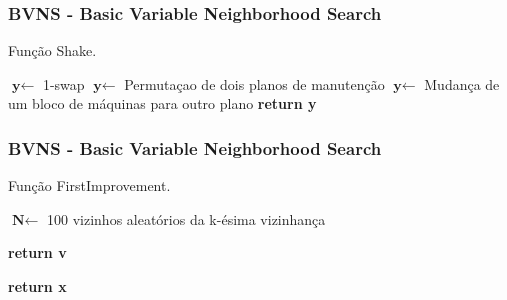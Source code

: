 \documentclass{beamer}
\begin{document}
    \begin{frame}
        \frametitle{BVNS - Basic Variable Neighborhood Search}
        \begin{algorithm}[H]
            \caption{Função Shake.}\label{alg:shake}
            \begin{algorithmic}[1]
                    \State $\textbf{y} \gets$ 1-swap
                \EndIf
                    \State $\textbf{y} \gets$ Permutaçao de dois planos de manutenção
                \EndIf
                    \State $\textbf{y} \gets$ Mudança de um bloco de máquinas para outro plano
                \EndIf
            \Statex
            \State \textbf{return y} 

            \EndProcedure 
            \end{algorithmic}
        \end{algorithm}
    \end{frame}

    \begin{frame}
        \frametitle{BVNS - Basic Variable Neighborhood Search}
        \begin{algorithm}[H]
            \caption{Função FirstImprovement.}\label{alg:first-improvement}

            \begin{algorithmic}[1]

            \State $\textbf{N} \gets$ 100 vizinhos aleatórios da k-ésima vizinhança


                    \State \textbf{return v} 
                \EndIf
            \EndFor
               
            \Statex
            \State \textbf{return x} 
            \EndProcedure 
            \end{algorithmic}
        \end{algorithm}
    \end{frame}
\end{document}
